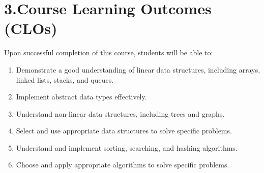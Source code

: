 \documentclass[11pt,a4paper]{article}
\begin{document}
\section*{3.\quad Course Learning Outcomes (CLOs)}
Upon successful completion of this course, students will be able to:
\begin{enumerate}
  \item Demonstrate a good understanding of linear data structures, including
        arrays, linked lists, stacks, and queues.
  \item Implement abstract data types effectively.
  \item Understand non-linear data structures, including trees and graphs.
  \item Select and use appropriate data structures to solve specific problems.
  \item Understand and implement sorting, searching, and hashing algorithms.
  \item Choose and apply appropriate algorithms to solve specific problems.
\end{enumerate}

\end{document}
